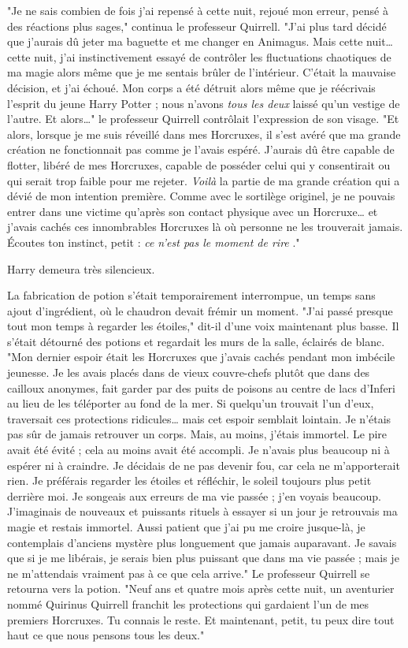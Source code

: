 "Je ne sais combien de fois j'ai repensé à cette nuit, rejoué mon erreur, pensé à des réactions plus sages," continua le professeur Quirrell. "J'ai plus tard décidé que j'aurais dû jeter ma baguette et me changer en Animagus. Mais cette nuit… cette nuit, j'ai instinctivement essayé de contrôler les fluctuations chaotiques de ma magie alors même que je me sentais brûler de l'intérieur. C'était la mauvaise décision, et j'ai échoué. Mon corps a été détruit alors même que je réécrivais l'esprit du jeune Harry Potter ; nous n'avons \emph{tous les deux}  laissé qu'un vestige de l'autre. Et alors…" le professeur Quirrell contrôlait l'expression de son visage. "Et alors, lorsque je me suis réveillé dans mes Horcruxes, il s'est avéré que ma grande création ne fonctionnait pas comme je l'avais espéré. J'aurais dû être capable de flotter, libéré de mes Horcruxes, capable de posséder celui qui y consentirait ou qui serait trop faible pour me rejeter. \emph{Voilà}  la partie de ma grande création qui a dévié de mon intention première. Comme avec le sortilège originel, je ne pouvais entrer dans une victime qu'après son contact physique avec un Horcruxe… et j'avais cachés ces innombrables Horcruxes là où personne ne les trouverait jamais. Écoutes ton instinct, petit : \emph{ce n'est pas le moment de rire} ."

Harry demeura très silencieux.

La fabrication de potion s'était temporairement interrompue, un temps sans ajout d'ingrédient, où le chaudron devait frémir un moment. "J'ai passé presque tout mon temps à regarder les étoiles," dit-il d'une voix maintenant plus basse. Il s'était détourné des potions et regardait les murs de la salle, éclairés de blanc. "Mon dernier espoir était les Horcruxes que j'avais cachés pendant mon imbécile jeunesse. Je les avais placés dans de vieux couvre-chefs plutôt que dans des cailloux anonymes, fait garder par des puits de poisons au centre de lacs d'Inferi au lieu de les téléporter au fond de la mer. Si quelqu'un trouvait l'un d'eux, traversait ces protections ridicules… mais cet espoir semblait lointain. Je n'étais pas sûr de jamais retrouver un corps. Mais, au moins, j'étais immortel. Le pire avait été évité ; cela au moins avait été accompli. Je n'avais plus beaucoup ni à espérer ni à craindre. Je décidais de ne pas devenir fou, car cela ne m'apporterait rien. Je préférais regarder les étoiles et réfléchir, le soleil toujours plus petit derrière moi. Je songeais aux erreurs de ma vie passée ; j'en voyais beaucoup. J'imaginais de nouveaux et puissants rituels à essayer si un jour je retrouvais ma magie et restais immortel. Aussi patient que j'ai pu me croire jusque-là, je contemplais d'anciens mystère plus longuement que jamais auparavant. Je savais que si je me libérais, je serais bien plus puissant que dans ma vie passée ; mais je ne m'attendais vraiment pas à ce que cela arrive." Le professeur Quirrell se retourna vers la potion. "Neuf ans et quatre mois après cette nuit, un aventurier nommé Quirinus Quirrell franchit les protections qui gardaient l'un de mes premiers Horcruxes. Tu connais le reste. Et maintenant, petit, tu peux dire tout haut ce que nous pensons tous les deux."

